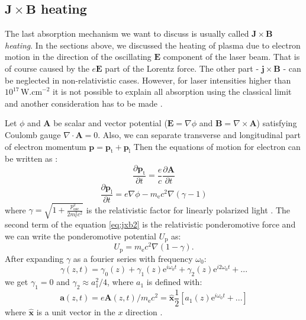 \subsection*{$\bm{J}\times \bm{B}$ heating}
The last absorption mechanism we want to discuss is usually called $\bm{J}\times \bm{B}$ \textit{heating}. In the sections above, we discussed the heating of plasma due to electron motion in the direction of the oscillating $\bm{E}$ component of the laser beam. That is of course caused by the $e\bm{E}$ part of the Lorentz force. The other part - $\bm{j \times B}$ - can be neglected in non-relativistic cases. However, for laser intensities higher than $10^{17}\,\mathrm{W.cm}^{-2}$ it is not possible to explain all absorption using the classical limit and another consideration has to be made \cite{cai2006}.

Let $\phi$ and $\bm{A}$ be scalar and vector potential ($\bm{E} = \nabla \phi$ and $\bm{B} = \nabla \times \bm{A}$) satisfying Coulomb gauge $\nabla \cdot \bm{A} = 0$. Also, we can separate transverse and longitudinal part of electron momentum $\bm{p} = \bm{p}_\mathrm{t}+\bm{p}_\mathrm{l}$  Then the equations of motion for electron can be written as \cite{cai2006}:
\begin{equation}
	\frac{\partial \bm{p}_\mathrm{t}}{\partial t} = \frac{e}{c} \frac{\partial \bm{A}}{\partial t}
	\label{eq:jxb1}
\end{equation}
\begin{equation}
	\frac{\partial \bm{p}_\mathrm{l}}{\partial t} = e\nabla \phi - m_{\mathrm{e}}c^2\nabla (\gamma-1)
	\label{eq:jxb2}
\end{equation}
where $\gamma = \sqrt{1+\frac{p^2_\mathrm{osc}}{2m^2_\mathrm{e}c^2}}$ is the relativistic factor for linearly polarized light \cite{absorption2}. The second term of the equation \ref{eq:jxb2} is the relativistic ponderomotive force and we can write the ponderomotive potential $U_\mathrm{p}$ as:
\begin{equation}
	U_\mathrm{p} = m_{\mathrm{e}}c^2\nabla (1 -\gamma).
	\label{eq:ponderomotive-potential}
\end{equation}
After expanding $\gamma$ as a fourier series with frequency $\omega_0$:
\begin{equation}
	\gamma(z,t) = \gamma_0(z) + \gamma_1(z)\mathrm{e}^{i\omega_0t} + \gamma_2(z)\mathrm{e}^{i2\omega_0t} + ...
\end{equation}
we get $\gamma_1 = 0$ and $\gamma_2 \approx a_1^2/4$, where $a_1$ is defined with:
\begin{equation}
	\bm{a}(z,t) = e\bm{A}(z,t)/m_\mathrm{e}c^2 = \hat{\bm{x}}\frac{1}{2}\left[a_1(z)\mathrm{e}^{i\omega_0 t} + ...\right]
\end{equation}
where $\hat{\bm{x}}$ is a unit vector in the $x$ direction \cite{cai2006}. 

